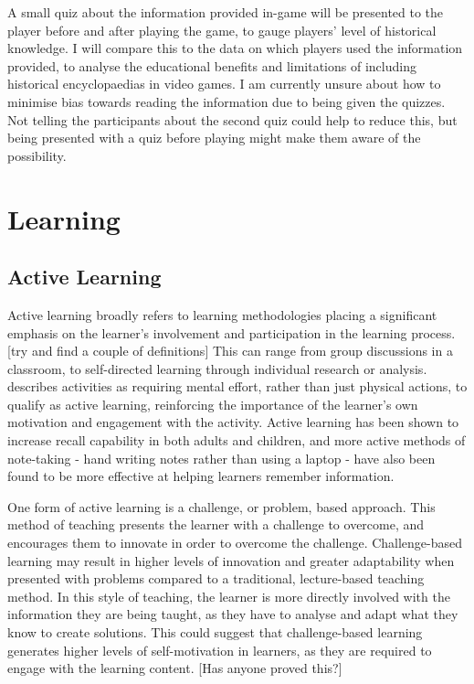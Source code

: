 \documentclass[journal]{IEEEtran}
\begin{document}
A small quiz about the information provided in-game will be presented to the player before and after playing the game, to gauge players’ level of historical knowledge. I will compare this to the data on which players used the information provided, to analyse the educational benefits and limitations of including historical encyclopaedias in video games. I am currently unsure about how to minimise bias towards reading the information due to being given the quizzes. Not telling the participants about the second quiz could help to reduce this, but being presented with a quiz before playing might make them aware of the possibility.

\section{Learning}

\subsection{Active Learning}

Active learning broadly refers to learning methodologies placing a significant emphasis on the learner's involvement and participation in the learning process. [try and find a couple of definitions] This can range from group discussions in a classroom, to self-directed learning through individual research or analysis. \cite{educationalAppsLearning} describes activities as requiring mental effort, rather than just physical actions, to qualify as active learning, reinforcing the importance of the learner's own motivation and engagement with the activity. Active learning has been shown to increase recall capability in both adults and children, \cite{educationalAppsLearning} and more active methods of note-taking - hand writing notes rather than using a laptop - have also been found to be more effective at helping learners remember information. \cite{notetakingOverLaptops}

One form of active learning is a challenge, or problem, based approach. This method of teaching presents the learner with a challenge to overcome, and encourages them to innovate in order to overcome the challenge. Challenge-based learning may result in higher levels of innovation and greater adaptability when presented with problems compared to a traditional, lecture-based teaching method. \cite{comparisonOfChallengeLearning} In this style of teaching, the learner is more directly involved with the information they are being taught, as they have to analyse and adapt what they know to create solutions. This could suggest that challenge-based learning generates higher levels of self-motivation in learners, as they are required to engage with the learning content. [Has anyone proved this?]
\end{document}
